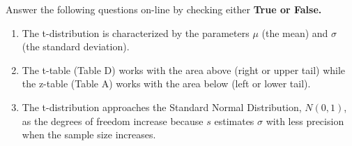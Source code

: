 \item Answer the following questions on-line by checking either \textbf{True or False.}
\begin{enumerate}
\item The t-distribution is characterized by the parameters $\mu$ (the mean) and $\sigma$ (the standard deviation). 
\item The t-table (Table D) works with the area above (right or upper tail) while the z-table (Table A) works with the area below (left or lower tail). 
\item The t-distribution approaches the Standard Normal Distribution, $N(0,1)$, as the degrees of freedom increase because $s$ estimates $\sigma$ with less precision when the sample size increases. 
\end{enumerate}


